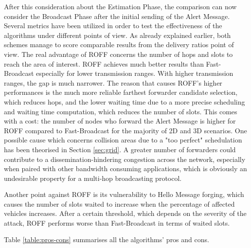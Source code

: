 		
		After this consideration about the Estimation Phase, the comparison can now consider the Broadcast Phase after the initial sending of the Alert Message. Several metrics have been utilized in order to test the effectiveness of the algorithms under different points of view. As already explained earlier, both schemes manage to score comparable results from the delivery ratios point of view. The real advantage of ROFF concerns the number of hops and slots to reach the area of interest. ROFF achieves much better results than Fast-Broadcast especially for lower transmission ranges. With higher transmission ranges, the gap is much narrower. The reason that causes ROFF's higher performances is the much more reliable farthest forwarder candidate selection, which reduces hops, and the lower waiting time due to a more precise scheduling and waiting time computation, which reduces the number of slots. This comes with a cost: the number of nodes who forward the Alert Message is higher for ROFF compared to Fast-Broadcast for the majority of 2D and 3D scenarios. One possible cause which concerns collision areas due to a "too perfect" schedulation has been theorised in Section \ref{sec:grid}. A greater number of forwarders could contribute to a dissemination-hindering congestion across the network, especially when paired with other bandwidth consuming applications, which is obviously an undesirable property for a multi-hop broadcasting protocol.
		
		
		Another point against ROFF is its vulnerability to Hello Message forging, which causes the number of slots waited to increase when the percentage of affected vehicles increases. After a certain threshold, which depends on the severity of the attack, ROFF performs worse than Fast-Broadcast in terms of waited slots.
		
		
		
		
		Table \ref{table:pros-cons} summarises all the algorithms' pros and cons.
		
